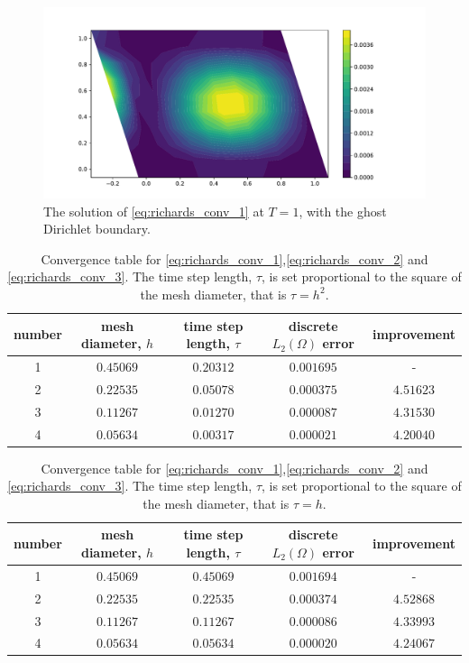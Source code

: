 \documentclass[../Main/main.tex]{subfiles}
\begin{document}
	\begin{figure}[H]
		\centering
		\includegraphics[width=1\linewidth]{PressureRichards11.pdf}
		\caption{The solution of \eqref{eq:richards_conv_1} at $T=1$, with the ghost Dirichlet boundary.}
		\label{fig:PressureRichards1}
	\end{figure}
	\begin{table}[H]
	\centering
	\begin{tabular}{|c c c c c|}
		\hline
			number & mesh diameter, $h$ & time step length, $\tau$ & discrete $L_2(\Omega)$ error & improvement \\
		\hline
1&$0.45069$&$0.20312$&$0.001695$&-\\ 
2&$0.22535$&$0.05078$&$0.000375$&$4.51623$\\
3&$0.11267$&$0.01270$&$0.000087$&$4.31530$\\
4&$0.05634$&$0.00317$&$0.000021$&$4.20040$\\
		\hline
	\end{tabular}
	\caption{Convergence table for \eqref{eq:richards_conv_1},\eqref{eq:richards_conv_2} and \eqref{eq:richards_conv_3}. The time step length, $\tau$, is set proportional to the square of the mesh diameter, that is $\tau=h^2$.}
	\label{tab:rihcards1}
\end{table}
	\begin{table}[H]
	\centering
		\begin{tabular}{|c c c c c|}
			\hline
			number & mesh diameter, $h$ & time step length, $\tau$ & discrete $L_2(\Omega)$ error & improvement \\
			\hline
1&$0.45069$&$0.45069$&$0.001694$&-\\ 
2&$0.22535$&$0.22535$&$0.000374$&$4.52868$\\
3&$0.11267$&$0.11267$&$0.000086$&$4.33993$\\
4&$0.05634$&$0.05634$&$0.000020$&$4.24067$\\
			\hline
		\end{tabular}
		\caption{Convergence table for \eqref{eq:richards_conv_1},\eqref{eq:richards_conv_2} and \eqref{eq:richards_conv_3}. The time step length, $\tau$, is set proportional to the square of the mesh diameter, that is $\tau=h$.}
		\label{tab:rihcards2}
	\end{table}
\end{document}
